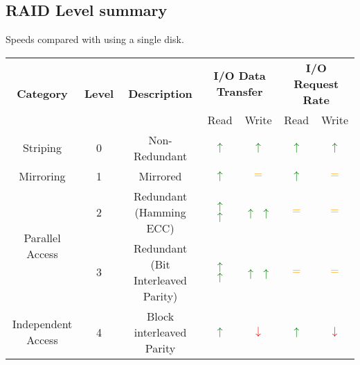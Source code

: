 \documentclass{report}
\begin{document}
\subsection*{RAID Level summary}
Speeds compared with using a single disk.
\begin{center}
	\begin{tabular}{c c c c c c c }
		\multirow{2}{*}{\textbf{Category}}  & \multirow{2}{*}{\textbf{Level}} & \multirow{2}{*}{\textbf{Description}} & \multicolumn{2}{c}{\textbf{I/O Data Transfer}}              & \multicolumn{2}{c}{\textbf{I/O Request Rate}}                                                                                                          \\
		                                    &                                 &                                       & Read                                                        & Write                                                       & Read                          & Write                                                    \\
		\hline
		Striping                            & 0                               & Non-Redundant                         & \textcolor{green}{$\uparrow$}                               & \textcolor{green}{$\uparrow$}                               & \textcolor{green}{$\uparrow$} & \textcolor{green}{$\uparrow$}                            \\
		Mirroring                           & 1                               & Mirrored                              & \textcolor{green}{$\uparrow$}                               & \textcolor{orange}{$=$}                                     & \textcolor{green}{$\uparrow$} & \textcolor{orange}{$=$}                                  \\
		\multirow{2}{*}{Parallel Access}    & 2                               & Redundant (Hamming ECC)               & \textcolor{green}{$\uparrow$} \textcolor{green}{$\uparrow$} & \textcolor{green}{$\uparrow$} \textcolor{green}{$\uparrow$} & \textcolor{orange}{$=$}       & \textcolor{orange}{$=$}                                  \\
		                                    & 3                               & Redundant (Bit Interleaved Parity)    & \textcolor{green}{$\uparrow$} \textcolor{green}{$\uparrow$} & \textcolor{green}{$\uparrow$} \textcolor{green}{$\uparrow$} & \textcolor{orange}{$=$}       & \textcolor{orange}{$=$}                                  \\
		\multirow{2}{*}{Independent Access} & 4                               & Block interleaved Parity              & \textcolor{green}{$\uparrow$}                               & \textcolor{red}{$\downarrow$}                               & \textcolor{green}{$\uparrow$} & \textcolor{red}{$\downarrow$}                            \\

\end{tabular}
\end{center}
\end{document}
